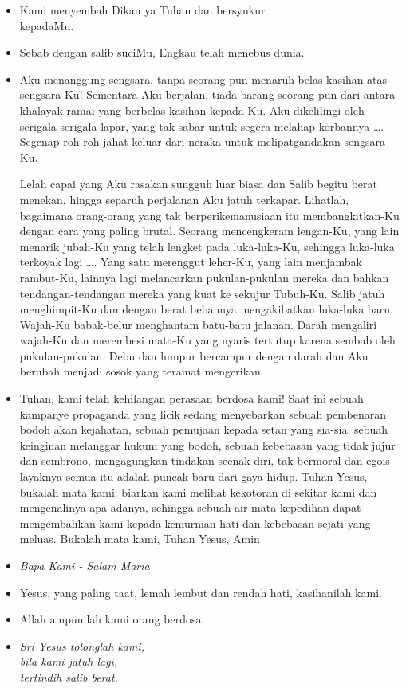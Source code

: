 \documentclass[a5paper,headsepline,titlepage,10pt,nnormalheadings,DIVcalc]{scrbook}
\newcommand{\BU}[1]{\begin{itemize} \item[U:] #1 \end{itemize}}
\newcommand{\BP}[1]{\begin{itemize} \item[P:] #1 \end{itemize}}
\newcommand{\kamiMenyembah}{\BP{ Kami menyembah Dikau ya Tuhan dan bersyukur\\kepadaMu.}
\BU{ Sebab dengan salib suciMu, Engkau telah menebus dunia.}
}
\newcommand{\kasihanilahKami}{\BP{Yesus, yang paling taat, lemah lembut dan rendah hati, kasihanilah kami.}
\BU{Allah ampunilah kami orang berdosa.}}
\begin{document}
\kamiMenyembah
\BP{Aku menanggung sengsara, tanpa seorang pun menaruh belas kasihan atas sengsara-Ku! Sementara Aku berjalan, tiada barang seorang pun dari antara khalayak ramai yang berbelas kasihan kepada-Ku. Aku dikelilingi oleh serigala-serigala lapar, yang tak sabar untuk segera melahap korbannya \dots . Segenap roh-roh jahat keluar dari neraka untuk melipatgandakan sengsara-Ku.

Lelah capai yang Aku rasakan sungguh luar biasa dan Salib begitu berat menekan, hingga separuh perjalanan Aku jatuh terkapar. Lihatlah, bagaimana orang-orang yang tak berperikemanusiaan itu membangkitkan-Ku dengan cara yang paling brutal. Seorang mencengkeram lengan-Ku, yang lain menarik jubah-Ku yang telah lengket pada luka-luka-Ku, sehingga luka-luka terkoyak lagi \dots . Yang satu merenggut leher-Ku, yang lain menjambak rambut-Ku, lainnya lagi melancarkan pukulan-pukulan mereka dan bahkan tendangan-tendangan mereka yang kuat ke sekujur Tubuh-Ku. Salib jatuh menghimpit-Ku dan dengan berat bebannya mengakibatkan luka-luka baru. Wajah-Ku babak-belur menghantam batu-batu jalanan. Darah mengaliri wajah-Ku dan merembesi mata-Ku yang nyaris tertutup karena sembab oleh pukulan-pukulan. Debu dan lumpur bercampur dengan darah dan Aku berubah menjadi sosok yang teramat mengerikan.}

\BU{Tuhan, kami telah kehilangan perasaan berdosa kami! Saat ini sebuah kampanye propaganda yang licik sedang menyebarkan sebuah pembenaran bodoh akan kejahatan, sebuah pemujaan kepada setan yang sia-sia, sebuah keinginan melanggar hukum yang bodoh, sebuah kebebasan yang tidak jujur dan sembrono, mengagungkan tindakan seenak diri, tak bermoral dan egois layaknya semua itu adalah puncak baru dari gaya hidup. Tuhan Yesus, bukalah mata kami: biarkan kami melihat kekotoran di sekitar kami dan mengenalinya apa adanya, sehingga sebuah air mata kepedihan dapat mengembalikan kami kepada kemurnian hati dan kebebasan sejati yang meluas. Bukalah mata kami, Tuhan Yesus, Amin 
}

\large\begin{itemize}\item[~]\it{Bapa Kami - Salam Maria}\end{itemize}\normalsize
\kasihanilahKami

\begin{itemize}
\item[4.] \it{Sri Yesus tolonglah kami, \\
	bila kami jatuh lagi,\\ 
	tertindih salib berat.}
\end{itemize}
\end{document}
